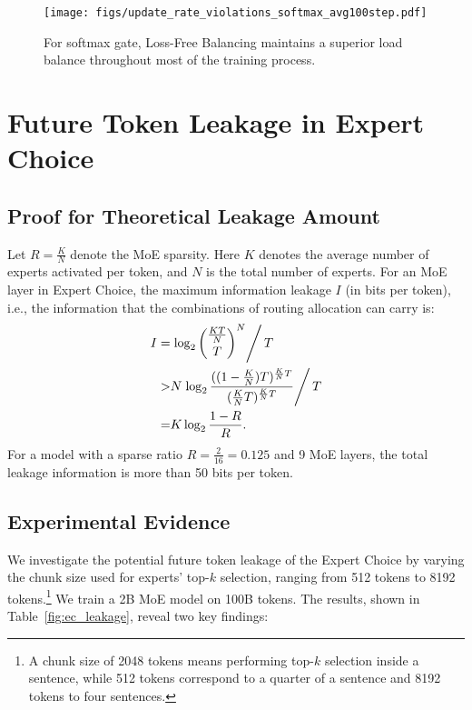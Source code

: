 \documentclass{article} %
\newcommand{\ours}{Loss-Free Balancing}
\begin{document}
\begin{figure}[t]
  \centering
    \texttt{[image: figs/update\_rate\_violations\_softmax\_avg100step.pdf]}
\caption{For softmax gate, \ours{} maintains a superior load balance throughout most of the training process.}
\label{fig:update_rate_violations_softmax_avg100step.pdf}
\end{figure}


\section{Future Token Leakage in Expert Choice}

\subsection{Proof for Theoretical Leakage Amount}
\label{app:ec_proof}
Let $R = \frac{K}{N}$ denote the MoE sparsity. Here $K$ denotes the average number of experts activated per token, and $N$ is the total number of experts.
For an MoE layer in Expert Choice, the maximum information leakage $I$ (in bits per token), i.e., the information that the combinations of routing allocation can carry is:
\begin{equation}
    \begin{aligned}
    I = & \left. \log_2 \binom{\frac{KT}{N}}{T}^N \right/ T\\
    > & N \left. \log_2 \frac{((1-\frac{K}{N})T)^{\frac{K}{N}T}}{(\frac{K}{N}T)^{\frac{K}{N}T}}\right/ T\\
    =& K\log_2\frac{1-R}{R}.
\end{aligned}
\end{equation}
For a model with a sparse ratio $R = \frac{2}{16}=0.125$ and 9 MoE layers, the total leakage information is more than 50 bits per token.



\subsection{Experimental Evidence}
\label{app:ec}
We investigate the potential future token leakage of the Expert Choice by varying the chunk size used for experts' top-$k$ selection, ranging from 512 tokens to 8192 tokens.\footnote{A chunk size of 2048 tokens means performing top-$k$ selection inside a sentence, while 512 tokens correspond to a quarter of a sentence and 8192 tokens to four sentences.}  We train a 2B MoE model on 100B tokens. The results, shown in Table~\ref{fig:ec_leakage}, reveal two key findings: 
\end{document}
